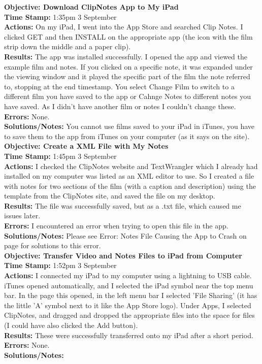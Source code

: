 \documentclass{article}
\begin{document}
\textbf{Objective: Download ClipNotes App to My iPad}\\
\textbf{Time Stamp:} 1:35pm 3 September\\
\textbf{Actions:} On my iPad, I went into the App Store and searched Clip Notes. I clicked GET and then INSTALL on the appropriate app (the icon with the film strip down the middle and a paper clip).\\
\textbf{Results:} The app was installed successfully. I opened the app and viewed the example film and notes. If you clicked on a specific note, it was expanded under the viewing window and it played the specific part of the film the note referred to, stopping at the end timestamp. You select Change Film to switch to a different film you have saved to the app or Cahnge Notes to different notes you have saved. As I didn't have another film or notes I couldn't change these.\\
\textbf{Errors:} None.\\
\textbf{Solutions/Notes:} You cannot use films saved to your iPad in iTunes, you have to save them to the app from iTunes on your computer (as it says on the site).\\

\textbf{Objective: Create a XML File with My Notes}\\
\textbf{Time Stamp:} 1:45pm 3 September\\
\textbf{Actions:} I checked the ClipNotes website and TextWrangler which I already had installed on my computer was listed as an XML editor to use. So I created a file with notes for two sections of the film (with a caption and description) using the template from the ClipNotes site, and saved the file on my desktop.\\
\textbf{Results:} The file was successfully saved, but as a .txt file, which caused me issues later. \\
\textbf{Errors:} I encountered an error when trying to open this file in the app. \\
\textbf{Solutions/Notes:} Please see Error: Notes File Causing the App to Crash on page \pageref{crash} for solutions to this error.\\

\textbf{Objective: Transfer Video and Notes Files to iPad from Computer}\\
\textbf{Time Stamp:} 1:52pm 3 September\\
\textbf{Actions:} I connected my iPad to my computer using a lightning to USB cable. iTunes opened automatically, and I selected the iPad symbol near the top menu bar. In the page this opened, in the left menu bar I selected 'File Sharing' (it has the little 'A' symbol next to it like the App Store logo). Under Apps, I selected ClipNotes, and dragged and dropped the appropriate files into the space for files (I could have also clicked the Add button).\\
\textbf{Results:} These were successfully transferred onto my iPad after a short period.\\
\textbf{Errors:} None. \\
\textbf{Solutions/Notes:}\\
\end{document}
